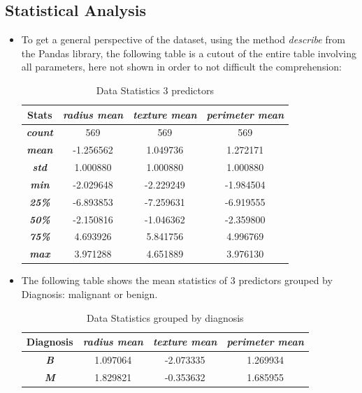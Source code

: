 \documentclass[conference]{IEEEtran}
\begin{document}
\subsection{Statistical Analysis}
\begin{itemize}
\item To get a general perspective of the dataset, using the method \textit{describe} from the Pandas library, the following table is a cutout of the entire table involving all parameters, here not shown in order to not difficult the comprehension: 

\begin{table}[htbp]
\caption{Data Statistics 3 predictors}
\begin{center}
\begin{tabular}{|c|c|c|c|}
\hline

\cline{2-4} 
\textbf{Stats} & \textbf{\textit{radius mean}}& \textbf{\textit{texture mean}}& \textbf{\textit{perimeter mean}} \\
\hline
\textbf{\textit{count}}& 569 & 569 & 569  \\
\hline
\textbf{\textit{mean}}&  -1.256562 & 1.049736 & 1.272171 \\
\hline
\textbf{\textit{std}}& 1.000880 & 1.000880 & 1.000880 \\ 
\hline
\textbf{\textit{min}} &-2.029648  & -2.229249 & -1.984504 \\ 
\hline
\textbf{\textit{25\%}}& -6.893853 &-7.259631	& -6.919555 \\
\hline
\textbf{\textit{50\%}}& -2.150816 &-1.046362 & -2.359800 \\ 
\hline
\textbf{\textit{75\%}}& 4.693926	& 5.841756 &4.996769 \\ 
\hline
\textbf{\textit{max}}& 3.971288 & 4.651889 & 3.976130 \\ 
\hline
\end{tabular}
\label{tab1}
\end{center}
\end{table}

\item The following table shows the mean statistics of 3 predictors grouped by Diagnosis: malignant or benign.


\begin{table}[htbp]
\caption{Data Statistics grouped by diagnosis}
\begin{center}
\begin{tabular}{|c|c|c|c|}
\hline

\cline{2-4} 
\textbf{Diagnosis} & \textbf{\textit{radius mean}}& \textbf{\textit{texture mean}}& \textbf{\textit{perimeter mean}} \\
\hline
\textbf{\textit{B}}& 1.097064 &-2.073335 &	1.269934  \\
\hline
\textbf{\textit{M}}& 1.829821 & -0.353632 & 1.685955 \\
\hline
\end{tabular}
\label{tab1}
\end{center}
\end{table}

\end{itemize}
\end{document}
